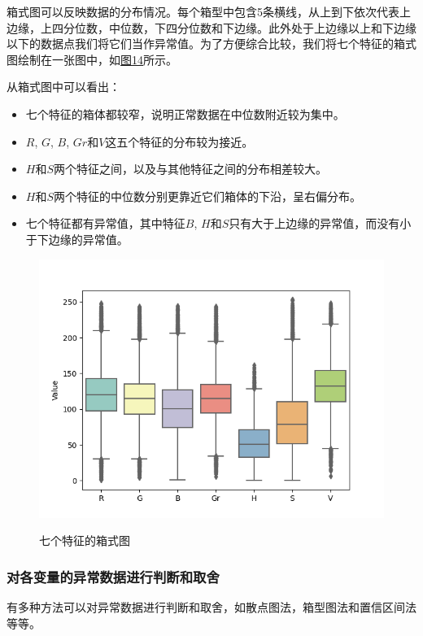 \documentclass[UTF8]{ctexart}
\begin{document}
	箱式图可以反映数据的分布情况。每个箱型中包含5条横线，从上到下依次代表上边缘，上四分位数，中位数，下四分位数和下边缘。此外处于上边缘以上和下边缘以下的数据点我们将它们当作异常值。为了方便综合比较，我们将七个特征的箱式图绘制在一张图中，如\hyperref[Fig.14]{图14}所示。
	
	从箱式图中可以看出：
	\begin{itemize}
		\item 七个特征的箱体都较窄，说明正常数据在中位数附近较为集中。
		\item $R$, $G$, $B$, $Gr$和$V$这五个特征的分布较为接近。
		\item $H$和$S$两个特征之间，以及与其他特征之间的分布相差较大。
		\item $H$和$S$两个特征的中位数分别更靠近它们箱体的下沿，呈右偏分布。
		\item 七个特征都有异常值，其中特征$B$, $H$和$S$只有大于上边缘的异常值，而没有小于下边缘的异常值。
	\end{itemize} 

	\begin{figure}[htbp]
		\centering
		\caption{七个特征的箱式图}
		\includegraphics[width=1.0\textwidth]{box_plot.png}
		\label{Fig.14}
	\end{figure}
	
	\subsubsection{对各变量的异常数据进行判断和取舍}
	
	有多种方法可以对异常数据进行判断和取舍，如散点图法，箱型图法和置信区间法等等。
	
\end{document}
